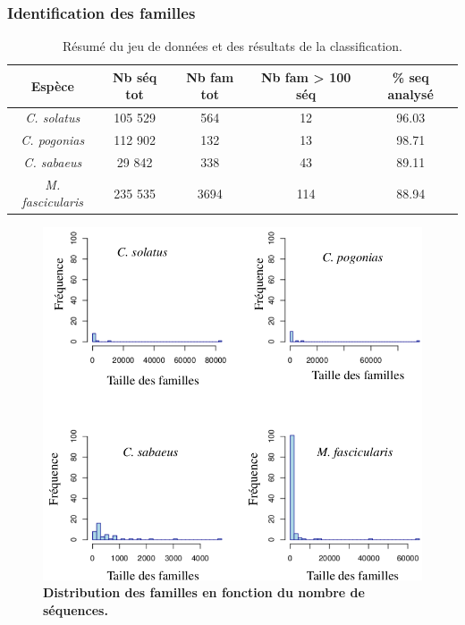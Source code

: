 \documentclass[12pt,a4paper]{article}
\begin{document}
			\subsubsection{Identification des familles}
	
				\begin{table}
			\center
			\begin{tabular}{|c|c|c|c|c|}
   			\hline
  			\textbf{Espèce} & \textbf{Nb séq tot} & \textbf{Nb fam tot} & \textbf{Nb fam > 100 séq} & \textbf{\%  seq analysé}\\
  		    \hline
   			\textit{C. solatus} & 105 529 & 564 & 12 & 96.03  \\
   			\hline
    		\textit{C. pogonias} & 112 902 & 132 & 13 & 98.71\\
   			\hline
   			\textit{C. sabaeus} & 29 842 & 338 & 43 & 89.11\\
   			\hline
   			\textit{M. fascicularis} & 235 535 & 3694 & 114 & 88.94\\
   			\hline			
			\end{tabular}
			\caption{Résumé du jeu de données et des résultats de la classification.}
			\label{tab_res}
		\end{table}
		
		\begin{figure}
			\center
			\includegraphics[scale=0.45]{img/distribution_familles.png}
			\caption{\textbf{Distribution des familles en fonction du nombre de séquences.}}
			\label{dist_fam} 
		\end{figure}
\end{document}
